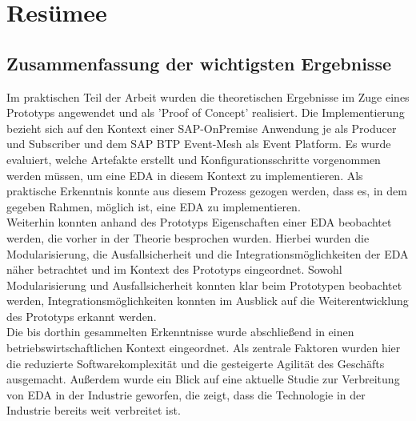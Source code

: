 \section{Resümee}
\subsection{Zusammenfassung der wichtigsten Ergebnisse}
Im praktischen Teil der Arbeit wurden die theoretischen Ergebnisse im Zuge eines Prototyps angewendet und als 'Proof of Concept' realisiert. Die Implementierung bezieht sich auf den Kontext einer SAP-OnPremise Anwendung je als Producer und Subscriber und dem SAP BTP Event-Mesh als Event Platform. Es wurde evaluiert, welche Artefakte erstellt und Konfigurationsschritte vorgenommen werden müssen, um eine \ac{EDA} in diesem Kontext zu implementieren. Als praktische Erkenntnis konnte aus diesem Prozess gezogen werden, dass es, in dem gegeben Rahmen, möglich ist, eine \ac{EDA} zu implementieren. \\
Weiterhin konnten anhand des Prototyps Eigenschaften einer \ac{EDA} beobachtet werden, die vorher in der Theorie besprochen wurden. Hierbei wurden die Modularisierung, die Ausfallsicherheit und die Integrationsmöglichkeiten der \ac{EDA} näher betrachtet und im Kontext des Prototyps eingeordnet. Sowohl Modularisierung und Ausfallsicherheit konnten klar beim Prototypen beobachtet werden, Integrationsmöglichkeiten konnten im Ausblick auf die Weiterentwicklung des Prototyps erkannt werden. \\
Die bis dorthin gesammelten Erkenntnisse wurde abschließend in einen betriebswirtschaftlichen Kontext eingeordnet. Als zentrale Faktoren wurden hier die reduzierte Softwarekomplexität und die gesteigerte Agilität des Geschäfts ausgemacht. Außerdem wurde ein Blick auf eine aktuelle Studie zur Verbreitung von \ac{EDA} in der Industrie geworfen, die zeigt, dass die Technologie in der Industrie bereits weit verbreitet ist.


